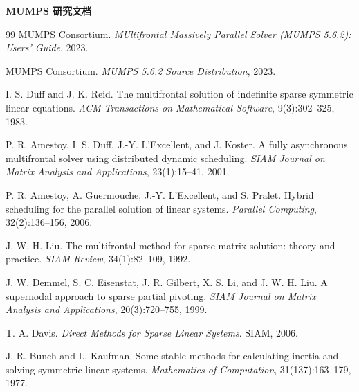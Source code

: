 \documentclass[UTF8,zihao=-4,oneside,openany,fontset=fandol]{ctexbook}
\begin{document}
\hypersetup{pageanchor=false}
\begin{titlepage}
  \centering
  \vspace*{8.5cm}

  {\bfseries\fontsize{45}{45}\selectfont
   MUMPS 研究文档}
\end{titlepage}
\hypersetup{pageanchor=true}

\frontmatter
\tableofcontents
\clearpage

\mainmatter





\appendix




\backmatter
\renewcommand{\bibname}{参考资料}
\begin{thebibliography}{99}
MUMPS Consortium. \emph{MUltifrontal Massively Parallel Solver (MUMPS 5.6.2): Users' Guide}, 2023.

MUMPS Consortium. \emph{MUMPS 5.6.2 Source Distribution}, 2023.

I. S. Duff and J. K. Reid. The multifrontal solution of indefinite sparse symmetric linear equations. \emph{ACM Transactions on Mathematical Software}, 9(3):302--325, 1983.

P. R. Amestoy, I. S. Duff, J.-Y. L'Excellent, and J. Koster. A fully asynchronous multifrontal solver using distributed dynamic scheduling. \emph{SIAM Journal on Matrix Analysis and Applications}, 23(1):15--41, 2001.

P. R. Amestoy, A. Guermouche, J.-Y. L'Excellent, and S. Pralet. Hybrid scheduling for the parallel solution of linear systems. \emph{Parallel Computing}, 32(2):136--156, 2006.

J. W. H. Liu. The multifrontal method for sparse matrix solution: theory and practice. \emph{SIAM Review}, 34(1):82--109, 1992.

J. W. Demmel, S. C. Eisenstat, J. R. Gilbert, X. S. Li, and J. W. H. Liu. A supernodal approach to sparse partial pivoting. \emph{SIAM Journal on Matrix Analysis and Applications}, 20(3):720--755, 1999.

T. A. Davis. \emph{Direct Methods for Sparse Linear Systems}. SIAM, 2006.

J. R. Bunch and L. Kaufman. Some stable methods for calculating inertia and solving symmetric linear systems. \emph{Mathematics of Computation}, 31(137):163--179, 1977.
\end{thebibliography}
\end{document}

